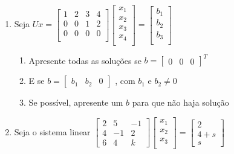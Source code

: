 \documentclass{article}
\begin{document}
\begin{enumerate}
	\item Seja $Ux = \begin{bmatrix}
			      1 & 2 & 3 & 4 \\
			      0 & 0 & 1 & 2 \\
			      0 & 0 & 0 & 0 \\
		      \end{bmatrix} \begin{bmatrix}
			      x_1 \\
			      x_2 \\
			      x_3 \\
			      x_4 \\
		      \end{bmatrix} = \begin{bmatrix}
			      b_1 \\
			      b_2 \\
			      b_3 \\
		      \end{bmatrix}$

	      \begin{enumerate}
		      \item Apresente todas as soluções se $b = \begin{bmatrix}
				            0 & 0 & 0
			            \end{bmatrix}^T $
		      \item E se $b = \begin{bmatrix}
				            b_1 & b_2 & 0
			            \end{bmatrix}$ , com $b_1$ e $b_2 \ne 0$
		      \item Se possível, apresente um $b$ para que não haja solução
	      \end{enumerate}

	\item Seja o sistema linear $\begin{bmatrix}
			      2 & 5  & -1 \\
			      4 & -1 & 2  \\
			      6 & 4  & k
		      \end{bmatrix} \begin{bmatrix}
			      x_1 \\
			      x_2 \\
			      x_3 \\
		      \end{bmatrix} = \begin{bmatrix}
			      2     \\
			      4 + s \\
			      s
		      \end{bmatrix}$


\end{enumerate}
\end{document}
